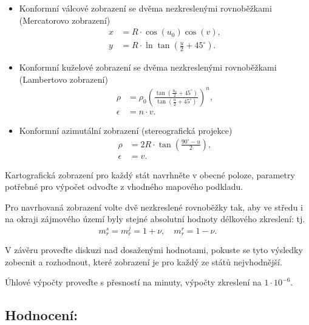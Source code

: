 \documentclass[12pt, a4paper]{article}
\begin{document}
\begin{itemize}
    \item {Konformní válcové zobrazení se dvěma nezkreslenými rovnoběžkami (Mercatorovo zobrazení)}
    \[
    \begin{aligned}
    x &= R \cdot \cos(u_{0})\cos(v), \\
    y &= R \cdot \ln \tan \left(\frac{u}{2}+45^{\circ}\right).
    \end{aligned}
    \]
    
    \item {Konformní kuželové zobrazení se dvěma nezkreslenými rovnoběžkami (Lambertovo zobrazení)}
    \[
    \begin{aligned}
    \rho &= \rho_{0}\left(\frac{\tan\left(\frac{u_{0}}{2}+45^{\circ}\right)}{\tan\left(\frac{u}{2}+45^{\circ}\right)}\right)^{n}, \\
    \epsilon &= n \cdot v.
    \end{aligned}
    \]
    
    \item {Konformní azimutální zobrazení (stereografická projekce)}
    \[
    \begin{aligned}
    \rho &= 2R \cdot \tan\left(\frac{90^{\circ}-u}{2}\right), \\
    \epsilon &= v.
    \end{aligned}
    \]
\end{itemize}

\vspace{3mm}
\noindent Kartografická zobrazení pro každý stát navrhněte v obecné poloze, parametry potřebné pro výpočet odvoďte z vhodného mapového podkladu.
\vspace{3mm}

\noindent Pro navrhovaná zobrazení volte dvě nezkreslené rovnoběžky tak, aby ve středu i na okraji zájmového území byly stejné absolutní hodnoty délkového zkreslení: tj.
\[
m_{r}^{s} = m_{r}^{j} = 1 + \nu, \quad m_{r}^{r} = 1 - \nu.
\]

\vspace{3mm}
\noindent V závěru proveďte diskuzi nad dosaženými hodnotami, pokuste se tyto výsledky zobecnit a rozhodnout, které zobrazení je pro každý ze států nejvhodnější.
\vspace{3mm}

\noindent Úhlové výpočty proveďte s přesností na minuty, výpočty zkreslení na $1 \cdot 10^{-6}$.

\vspace{1cm}
\subsection*{\textbf{Hodnocení:}}
\end{document}

